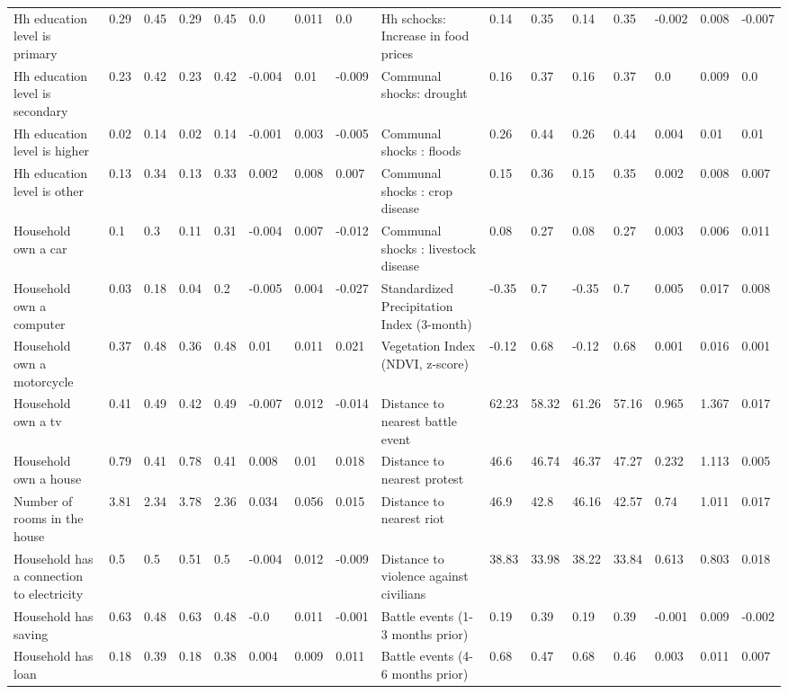 \begin{table}[H]
{\begin{tabular}{@{}llllllll|llllllll@{}}
Hh education level is primary & 0.29 & 0.45 & 0.29 & 0.45 & 0.0 & 0.011 & 0.0 & Hh schocks: Increase in food prices & 0.14 & 0.35 & 0.14 & 0.35 & -0.002 & 0.008 & -0.007 \\
Hh education level is secondary & 0.23 & 0.42 & 0.23 & 0.42 & -0.004 & 0.01 & -0.009 & Communal shocks: drought & 0.16 & 0.37 & 0.16 & 0.37 & 0.0 & 0.009 & 0.0 \\
Hh education level is higher & 0.02 & 0.14 & 0.02 & 0.14 & -0.001 & 0.003 & -0.005 & Communal shocks : floods & 0.26 & 0.44 & 0.26 & 0.44 & 0.004 & 0.01 & 0.01 \\
Hh education level is other & 0.13 & 0.34 & 0.13 & 0.33 & 0.002 & 0.008 & 0.007 & Communal shocks : crop disease & 0.15 & 0.36 & 0.15 & 0.35 & 0.002 & 0.008 & 0.007 \\
Household own a car & 0.1 & 0.3 & 0.11 & 0.31 & -0.004 & 0.007 & -0.012 & Communal shocks : livestock disease & 0.08 & 0.27 & 0.08 & 0.27 & 0.003 & 0.006 & 0.011 \\
Household own a computer & 0.03 & 0.18 & 0.04 & 0.2 & -0.005 & 0.004 & -0.027 & Standardized Precipitation Index (3-month) & -0.35 & 0.7 & -0.35 & 0.7 & 0.005 & 0.017 & 0.008 \\
Household own a motorcycle & 0.37 & 0.48 & 0.36 & 0.48 & 0.01 & 0.011 & 0.021 & Vegetation Index (NDVI, z-score) & -0.12 & 0.68 & -0.12 & 0.68 & 0.001 & 0.016 & 0.001 \\
Household own a tv & 0.41 & 0.49 & 0.42 & 0.49 & -0.007 & 0.012 & -0.014 & Distance to nearest battle event & 62.23 & 58.32 & 61.26 & 57.16 & 0.965 & 1.367 & 0.017 \\
Household own a house & 0.79 & 0.41 & 0.78 & 0.41 & 0.008 & 0.01 & 0.018 & Distance to nearest protest & 46.6 & 46.74 & 46.37 & 47.27 & 0.232 & 1.113 & 0.005 \\
Number of rooms in the house & 3.81 & 2.34 & 3.78 & 2.36 & 0.034 & 0.056 & 0.015 & Distance to nearest riot & 46.9 & 42.8 & 46.16 & 42.57 & 0.74 & 1.011 & 0.017 \\
Household has a connection to electricity & 0.5 & 0.5 & 0.51 & 0.5 & -0.004 & 0.012 & -0.009 & Distance to violence against civilians & 38.83 & 33.98 & 38.22 & 33.84 & 0.613 & 0.803 & 0.018 \\
Household has saving & 0.63 & 0.48 & 0.63 & 0.48 & -0.0 & 0.011 & -0.001 & Battle events (1-3 months prior) & 0.19 & 0.39 & 0.19 & 0.39 & -0.001 & 0.009 & -0.002 \\
Household has loan & 0.18 & 0.39 & 0.18 & 0.38 & 0.004 & 0.009 & 0.011 & Battle events (4-6 months prior) & 0.68 & 0.47 & 0.68 & 0.46 & 0.003 & 0.011 & 0.007 \\

\end{tabular}}
\end{table}
